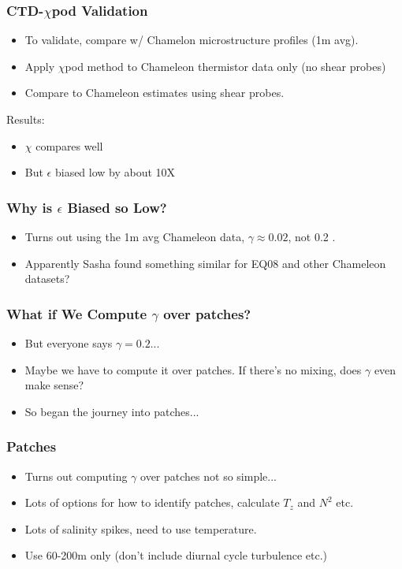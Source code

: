 \documentclass{beamer}
\begin{document}
\begin{frame}
 \frametitle{CTD-$\chi$pod Validation}

   \begin{itemize}
  \item To validate, compare w/ Chamelon microstructure profiles (1m avg).
  \item Apply $\chi$pod method to Chameleon thermistor data only (no shear probes)
  \item Compare to Chameleon estimates using shear probes.
  \end{itemize}

Results:
   \begin{itemize}
  \item $\chi$ compares well
  \item But $\epsilon$ biased low by about 10X
    \end{itemize}

\end{frame}




\begin{frame}
 \frametitle{Why is $\epsilon$ Biased so Low?}

\begin{itemize}
\item Turns out using the 1m avg Chameleon data, $\gamma \approx 0.02$, not 0.2  .
\item Apparently Sasha found something similar for EQ08 and other Chameleon datasets?
\end{itemize}

\end{frame}



\begin{frame}
 \frametitle{What if We Compute $\gamma$ over patches?}
\begin{itemize}
\item But everyone says $\gamma=0.2$...
\item Maybe we have to compute it over patches. If there's no mixing, does $\gamma$ even make sense?
\item So began the journey into patches...
\end{itemize}

\end{frame}





\begin{frame}
 \frametitle{Patches}
\begin{itemize}
\item Turns out computing $\gamma$ over patches not so simple...
\item Lots of options for how to identify patches, calculate $T_z$ and $N^2$ etc.
\item Lots of salinity spikes, need to use temperature.
\item Use 60-200m only (don't include diurnal cycle turbulence etc.)
\end{itemize}

\end{frame}
\end{document}
